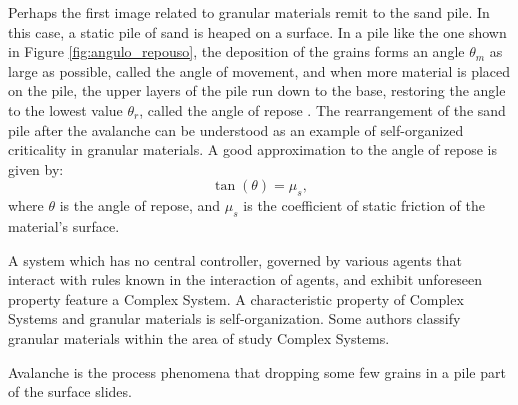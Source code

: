     Perhaps the first image related to granular materials remit to the sand pile. In this case, a static pile of sand is heaped on a surface. In a pile like the one shown in Figure \ref{fig:angulo_repouso}, the deposition of the grains forms an angle $\theta _m$ as large as possible, called the angle of movement, and when more material is placed on the pile, the upper layers of the pile run down to the base, restoring the angle to the lowest value $\theta _r$, called the angle of repose \cite{Sands_Powders_and_Grains, Granular_Physics}. The rearrangement of the sand pile after the avalanche can be understood as an example of self-organized criticality in granular materials. A good approximation to the angle of repose is given by:
    \begin{equation}
        \label{equ:atrito}
        \tan(\theta) = \mu _s ,
    \end{equation}
where $\theta$ is the angle of repose, and $\mu _s$ is the coefficient of static friction of the material's surface.

    A system which has no central controller, governed by various agents that interact with rules known in the interaction of agents, and exhibit unforeseen property feature a Complex System. A characteristic property of Complex Systems and granular materials is self-organization. Some authors \cite{Avalanche_Dynamics_in_a_Pile_of_Rice, Avalanche_Prediction_in_a_Self-Organized_Pile_of_Beads, Mixing_and_Segregation_of_Granular_Materials, Measuring_the_flowing_properties_of_powders_and_grains, Revisiting_localized_deformation_in_sand_with_complex_systems, Granular_matter_and_networks, Patterns_and_collective_behavior_in_granular_media, Florent-Tese} classify granular materials within the area of study Complex Systems.

    Avalanche is the process phenomena that dropping some few grains in a pile part of the surface slides.

